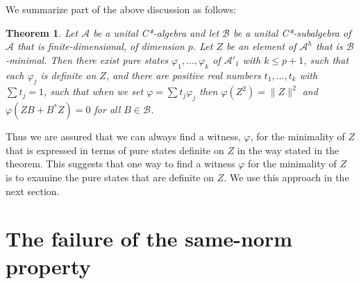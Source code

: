 \documentclass[12pt]{amsart}
\newcommand{\<}{\langle}
\renewcommand{\>}{\rangle}
\newcommand{\var}{\varphi}
\newcommand{\cA}{{\mathcal A}}
\newcommand{\cB}{{\mathcal B}}
\newcommand{\cAo}{{\mathcal A}'_1}
\newcommand{\cAH}{{\mathcal A}^h}
\newtheorem{theorem}{Theorem}[section]
\theoremstyle{definition}   %
\begin{document}
We summarize part of the above discussion as follows:

\begin{theorem}
\label{thm-fd}
Let $\cA$ be a unital C*-algebra and let $\cB$ be a unital C*-subalgebra
of $\cA$ that is finite-dimensional, of dimension $p$. Let $Z$ be an
element of $\cAH$ that is $\cB$-minimal. Then
there exist pure states $\var_1, \dots, \var_k$ of $\cAo$
with $k \leq p+1$, such that each $\var_j$ is definite on $Z$, and there are
positive real numbers $t_1, \dots, t_k$ with $\sum t_j = 1$,
such that when we set $\var = \sum t_j\var_j$ then
$\var(Z^2) = \|Z\|^2$ and $\var(ZB + B^*Z) = 0$
for all $B \in \cB$.
\end{theorem}

Thus we are assured that we can always find a witness, $\var$, for 
the minimality of $Z$ that is expressed in terms of pure states definite on
$Z$ in the way stated in the theorem. This suggests that one way to
find a witness $\var$ for the minimality of $Z$
is to examine the pure states that are definite
on $Z$. We use this approach in the next section.


\section{The failure of the same-norm property}
\label{ex}
\end{document}
